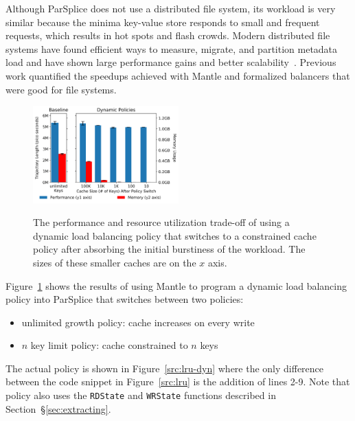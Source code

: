 Although ParSplice does not use a distributed file system, its workload is very
similar because the minima key-value store responds to small and frequent
requests, which results in hot spots and flash crowds.  Modern distributed file
systems have found efficient ways to measure, migrate, and partition metadata
load and have shown large performance gains and
better scalability~\cite{zheng:pdsw2014-batchfs, zheng:pdsw2015-deltafs,
grider:pdsw2015-marfs, ren:sc2014-indexfs, patil:fast2011-giga+,
brandt:msst2003-lh}.  Previous work quantified the speedups achieved with
Mantle and formalized balancers that were good for file systems.

\begin{figure}[t]
  \noindent\includegraphics[width=0.5\textwidth]{figures/methodology-tradeoff-dynamic.png}\\
  \caption{The performance and resource utilization trade-off of using a
  dynamic load balancing policy that switches to a constrained cache policy after absorbing
  the initial burstiness of the workload. The sizes of these smaller caches are
  on the \(x\) axis.  \label{fig:methodology-tradeoff-dynamic}}
\end{figure}

Figure~\ref{fig:methodology-tradeoff-dynamic} shows the results of using Mantle
to program a dynamic load balancing policy into ParSplice that switches between
two policies:

\begin{itemize}
  \item unlimited growth policy: cache increases on every write
  \item \(n\) key limit policy: cache constrained to \(n\) keys
\end{itemize}

The actual policy is shown in Figure~\ref{src:lru-dyn} where the only
difference between the code snippet in Figure~\ref{src:lru} is the addition of
lines 2-9. Note that policy also uses the \texttt{RDState} and \texttt{WRState}
functions described in Section~\S\ref{sec:extracting}.

